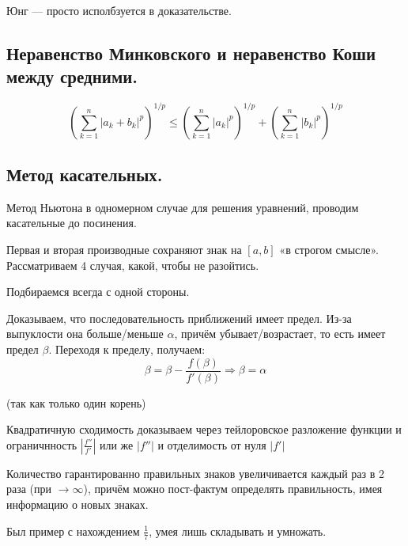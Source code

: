 \documentclass[12pt, a4paper]{article}
\begin{document}
Юнг — просто исполбзуется в доказательстве.




\subsection{Неравенство Минковского и неравенство Коши между средними.}

\begin{equation*}
    \left(\sum_{k=1}^{n}\left|a_{k}+b_{k}\right|^{p}\right)^{1 / p} \leqslant\left(\sum_{k=1}^{n}\left|a_{k}\right|^{p}\right)^{1 / p}+\left(\sum_{k=1}^{n}\left|b_{k}\right|^{p}\right)^{1 / p}
\end{equation*}

\subsection{Метод касательных.}

Метод Ньютона в одномерном случае для решения уравнений, проводим касательные до посинения.

Первая и вторая производные сохраняют знак на $[a, b]$ «в строгом смысле».
Рассматриваем 4 случая, какой, чтобы не разойтись.

Подбираемся всегда с одной стороны.

Доказываем, что последовательность приближений имеет предел. Из-за выпуклости она больше/меньше $\alpha$, 
причём убывает/возрастает, то есть имеет предел $\beta$. Переходя к пределу, получаем:
\begin{equation*}
    \beta = \beta - \frac{f(\beta)}{f'(\beta)} \Longrightarrow \beta = \alpha
\end{equation*}

(так как только один корень)

Квадратичную сходимость доказываем через тейлоровское разложение функции 
и ограничнность $\left| \frac{f''}{f'} \right|$ или же $\left| f'' \right|$ и отделимость от нуля $\left| f' \right|$

Количество гарантированно правильных знаков увеличивается каждый раз в 2 раза (при $\rightarrow \infty$), причём можно пост-фактум определять правильность, имея информацию о новых знаках.

Был пример с нахождением $\frac{1}{7}$, умея лишь складывать и умножать.
\end{document}
